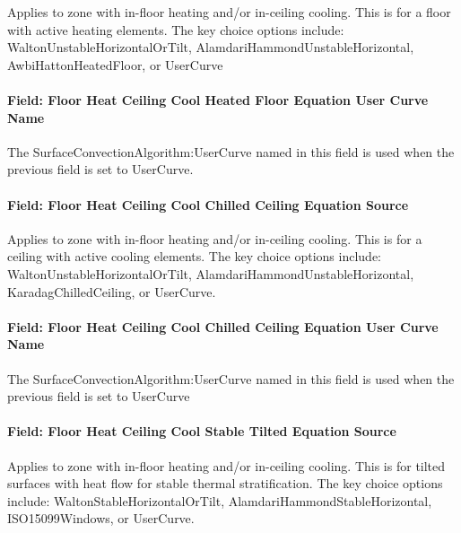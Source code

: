 Applies to zone with in-floor heating and/or in-ceiling cooling. This is for a floor with active heating elements. The key choice options include: WaltonUnstableHorizontalOrTilt, AlamdariHammondUnstableHorizontal, AwbiHattonHeatedFloor, or UserCurve

\paragraph{Field: Floor Heat Ceiling Cool Heated Floor Equation User Curve Name}\label{field-floor-heat-ceiling-cool-heated-floor-equation-user-curve-name}

The SurfaceConvectionAlgorithm:UserCurve named in this field is used when the previous field is set to UserCurve.

\paragraph{Field: Floor Heat Ceiling Cool Chilled Ceiling Equation Source}\label{field-floor-heat-ceiling-cool-chilled-ceiling-equation-source}

Applies to zone with in-floor heating and/or in-ceiling cooling. This is for a ceiling with active cooling elements. The key choice options include: WaltonUnstableHorizontalOrTilt, AlamdariHammondUnstableHorizontal, KaradagChilledCeiling, or UserCurve.

\paragraph{Field: Floor Heat Ceiling Cool Chilled Ceiling Equation User Curve Name}\label{field-floor-heat-ceiling-cool-chilled-ceiling-equation-user-curve-name}

The SurfaceConvectionAlgorithm:UserCurve named in this field is used when the previous field is set to UserCurve

\paragraph{Field: Floor Heat Ceiling Cool Stable Tilted Equation Source}\label{field-floor-heat-ceiling-cool-stable-tilted-equation-source}

Applies to zone with in-floor heating and/or in-ceiling cooling. This is for tilted surfaces with heat flow for stable thermal stratification. The key choice options include: WaltonStableHorizontalOrTilt, AlamdariHammondStableHorizontal, ISO15099Windows, or UserCurve.

